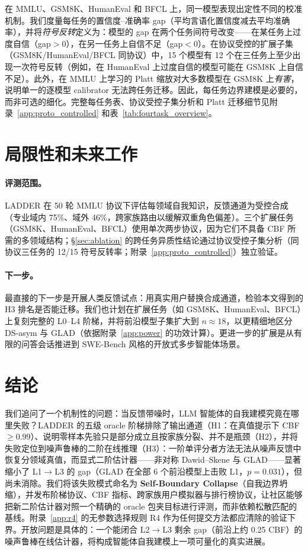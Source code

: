 \documentclass[11pt,a4paper,fontset=fandol]{ctexart}
\begin{document}
在 MMLU、GSM8K、HumanEval 和 BFCL 上，同一模型表现出定性不同的校准机制。我们度量每任务的置信度--准确率 gap（平均言语化置信度减去平均准确率），并将\emph{符号反转}定义为：模型的 gap 在两个任务间符号改变——在某任务上过度自信（gap${>}0$），在另一任务上自信不足（gap${<}0$）。在协议受控的扩展子集（GSM8K/HumanEval/BFCL 同协议）中，15 个模型有 12 个在三任务上至少出现一次符号反转（例如，在 HumanEval 上过度自信的模型可能在 GSM8K 上自信不足）。此外，在 MMLU 上学习的 Platt 缩放对大多数模型在 GSM8K 上\emph{有害}，说明单一的逐模型 calibrator 无法跨任务迁移。因此，每任务边界建模是必要的，而非可选的细化。完整每任务表、协议受控子集分析和 Platt 迁移细节见附录~\ref{app:proto_controlled} 和表~\ref{tab:fourtask_overview}。
\section{局限性和未来工作}
\label{sec:limitations}

\paragraph{评测范围。} LADDER 在 50 轮 MMLU 协议下评估每领域自我知识，反馈通道为受控合成（专业域内 75\%、域外 46\%，跨家族路由以缓解双重角色偏差）。三个扩展任务（GSM8K、HumanEval、BFCL）使用单次两步协议，因为它们不具备 CBF 所需的多领域结构；\S\ref{sec:ablation} 的跨任务异质性结论通过协议受控子集分析（同协议三任务的 12/15 符号反转率；附录~\ref{app:proto_controlled}）独立验证。

\paragraph{下一步。} 最直接的下一步是开展人类反馈试点：用真实用户替换合成通道，检验本文得到的 H3 排名是否能迁移。我们也计划在扩展任务（如 GSM8K、HumanEval、BFCL）上复刻完整的 L0--L4 阶梯，并将前沿模型子集扩大到 $n\!\approx\!18$，以更精细地区分 DS-asym 与 GLAD（依据附录~\ref{app:power} 的功效计算）。更进一步的扩展是从有限的问答会话推进到 SWE-Bench 风格的开放式多步智能体场景。


\section{结论}
\label{sec:conclusion}

我们追问了一个机制性的问题：当反馈带噪时，LLM 智能体的自我建模究竟在哪里失败？LADDER 的五级 oracle 阶梯排除了输出通道（H1：在真值提示下 CBF $\geq 0.99$）、说明零样本先验只是部分成立且按家族分裂、并不是瓶颈（H2），并将失败定位到噪声鲁棒的二阶在线推理（H3）：一阶单评分者方法无法从噪声反馈中恢复分领域真值，而显式二阶估计器——非对称 Dawid--Skene 与 GLAD——显著缩小了 L1$\to$L3 的 gap（GLAD 在全部 6 个前沿模型上击败 L1，$p=0.031$），但尚未消除。我们将该失败模式命名为 \textbf{Self-Boundary Collapse}（自我边界坍缩），并发布阶梯协议、CBF 指标、跨家族用户模拟器与排行榜协议，让社区能够把新二阶估计器对照一个精确的 oracle 包夹目标进行评测，而非依赖松散匹配的基线。附录~\ref{app:r4} 的无参数选择规则 R4 作为任何提交方法都应清除的验证下界。开放问题是具体的：一个能闭合 L2$\to$L3 剩余 gap（前沿上约 0.25 CBF）的噪声鲁棒在线估计器，将构成智能体自我建模上一项可量化的真实进展。
\end{document}
